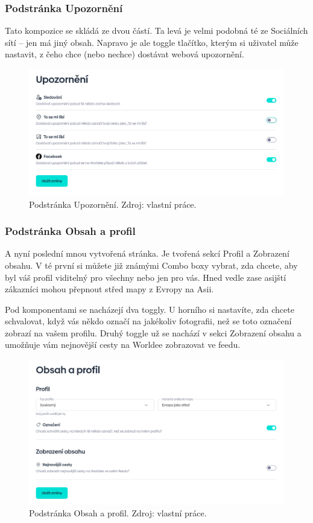 \newpage
\subsubsection{Podstránka Upozornění}
Tato kompozice se skládá ze dvou částí. Ta levá je velmi podobná té ze Sociálních sítí – jen má jiný obsah. Napravo je ale toggle tlačítko, kterým si uživatel může nastavit, z čeho chce (nebo nechce) dostávat webová upozornění.

\begin{figure}[!h]
    \centering
    \includegraphics[width=1\linewidth]{obrazky/notify_settings.png}
    \caption{Podstránka Upozornění. Zdroj: vlastní práce.}
\end{figure}


\newpage
\subsubsection{Podstránka Obsah a profil}
A nyní poslední mnou vytvořená stránka. Je tvořená sekcí Profil a Zobrazení obsahu. V té první si můžete již známými Combo boxy vybrat, zda chcete, aby byl váš profil viditelný pro všechny nebo jen pro vás. Hned vedle zase asijští zákazníci mohou přepnout střed mapy z Evropy na Asii.

Pod komponentami se nacházejí dva toggly. U horního si nastavíte, zda chcete schvalovat, když vás někdo označí na jakékoliv fotografii, než se toto označení zobrazí na vašem profilu. Druhý toggle už se nachází v sekci Zobrazení obsahu a umožňuje vám nejnovější cesty na Worldee zobrazovat ve feedu.

\begin{figure}[!h]
    \centering
    \includegraphics[width=1\linewidth]{obrazky/content_and_profile.png}
    \caption{Podstránka Obsah a profil. Zdroj: vlastní práce.}
\end{figure}


